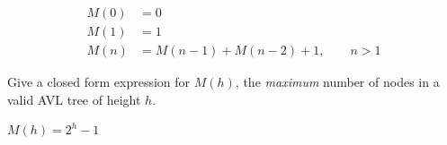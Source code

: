 \documentclass[12pt]{exam}
\begin{document}
\begin{questions}
\begin{parts}
\begin{subparts}
\begin{solution}
  \begin{align*}
    M(0) &= 0 \\
    M(1) &= 1 \\
    M(n) &= M(n-1) + M(n-2) + 1, \qquad n > 1
    \end{align*}
\end{solution}

\subpart[1] Give a closed form expression for $M(h)$, the
\emph{maximum} number of nodes in a valid AVL tree of height $h$.

\begin{solution}
$M(h) = 2^{h} - 1$
\vspace{10pt}
\end{solution}

\end{subparts}
\end{parts}


\end{questions}
\end{document}
